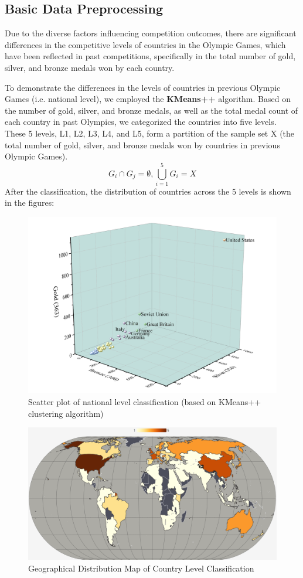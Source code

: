 \documentclass[12pt]{article}  %
\begin{document}
\subsection{Basic Data Preprocessing}
Due to the diverse factors influencing competition outcomes, there are significant differences in the competitive levels of countries in the Olympic Games, which have been reflected in past competitions, specifically in the total number of gold, silver, and bronze medals won by each country. 

To demonstrate the differences in the levels of countries in previous Olympic Games (i.e. national level), we employed the \textbf{KMeans++} algorithm. Based on the number of gold, silver, and bronze medals, as well as the total medal count of each country in past Olympics, we categorized the countries into five levels. These 5 levels, L1, L2, L3, L4, and L5, form a partition of the sample set X (the total number of gold, silver, and bronze medals won by countries in previous Olympic Games).
\begin{equation}
G_{i} \cap G_{j}=\emptyset, \bigcup_{i=1}^{5} G_{i}=X
\end{equation}
After the classification, the distribution of countries across the 5 levels is shown in the figures:
\begin{figure}[H]
	\centering
	\includegraphics[width=12cm]{img/Level1.png}
	\caption{Scatter plot of national level classification (based on KMeans++ clustering algorithm)}
	\label{fig:aa}
\end{figure}

\begin{figure}[H]
	\centering
	\includegraphics[width=12cm]{img/Level2.png}
	\caption{Geographical Distribution Map of Country Level Classification}
	\label{fig:aa}
\end{figure}
\end{document}
